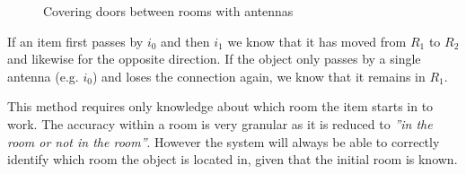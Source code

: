 \begin{figure}[h]
\centering

\caption{Covering doors between rooms with antennas}
\label{rooms:fig:rooms}
\end{figure}

If an item first passes by $i_0$ and then $i_1$ we know that it has moved from $R_1$ to $R_2$ and likewise for the opposite direction.
If the object only passes by a single antenna (e.g. $i_0$) and loses the connection again, we know that it remains in $R_1$.

This method requires only knowledge about which room the item starts in to work.
The accuracy within a room is very granular as it is reduced to \textit{''in the room or not in the room''}.
However the system will always be able to correctly identify which room the object is located in, given that the initial room is known.